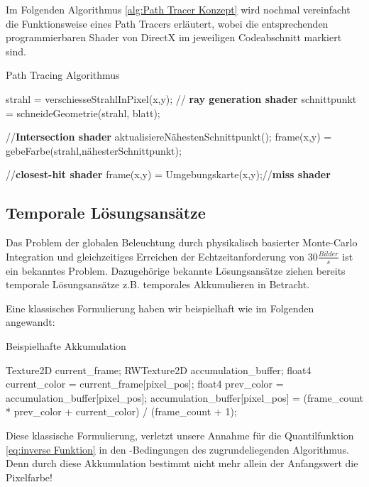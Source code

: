 \newpage
Im Folgenden Algorithmus \ref{alg:Path Tracer Konzept} wird nochmal vereinfacht die Funktionsweise 
eines Path Tracers erläutert, wobei die entsprechenden programmierbaren Shader von DirectX 
im jeweiligen Codeabschnitt markiert sind.

\begin{tcolorbox}
\begin{algorithm}[H]
    \caption{Path Tracing Algorithmus}
    \begin{algorithmic}[1]
        \State strahl = verschiesseStrahlInPixel(x,y); // \textbf{ray generation shader}
        \State schnittpunkt = schneideGeometrie(strahl, blatt);\par
        //\textbf{Intersection shader}
        \State aktualisiereNähestenSchnittpunkt();
        \EndIf
        \EndFor
        \State frame(x,y) = gebeFarbe(strahl,nähesterSchnittpunkt);\par
        //\textbf{closest-hit shader}
        \Else
        \State frame(x,y) = Umgebungskarte(x,y);//\textbf{miss shader}
        \EndIf
        \EndFor
        \EndProcedure
    \end{algorithmic}
    \label{alg:Path Tracer Konzept}
\end{algorithm}
\end{tcolorbox}

\subsection{Temporale Lösungsansätze}

Das Problem der globalen Beleuchtung durch physikalisch basierter Monte-Carlo Integration und gleichzeitiges Erreichen der 
Echtzeitanforderung von 30$\frac{Bilder}{s}$ ist ein bekanntes Problem. Dazugehörige bekannte Lösungsansätze 
ziehen bereits temporale Lösungsansätze z.B. temporales Akkumulieren \cite{schied2017spatiotemporal} in Betracht. 
\par 

Eine klassisches Formulierung \cite{UE4TAA} haben wir beispielhaft wie im Folgenden angewandt:

\begin{tcolorbox}
  \begin{algorithm}[H]
    \caption{Beispielhafte Akkumulation}
    \begin{algorithmic}[1]
        \State Texture2D current\_frame;
        \State RWTexture2D accumulation\_buffer;
        \State float4 current\_color = current\_frame[pixel\_pos];
        \State float4 prev\_color = accumulation\_buffer[pixel\_pos];
        \State accumulation\_buffer[pixel\_pos] = 
        \State (frame\_count * prev\_color + current\_color) / (frame\_count + 1);
    \end{algorithmic}
    \label{alg:TemporalAccumulation}
\end{algorithm}
\end{tcolorbox}

Diese klassische Formulierung, verletzt unsere Annahme für die Quantilfunktion \ref{eq:inverse Funktion}
in den -Bedingungen des zugrundeliegenden Algorithmus. 
Denn durch diese Akkumulation bestimmt nicht mehr allein der Anfangswert die Pixelfarbe!




